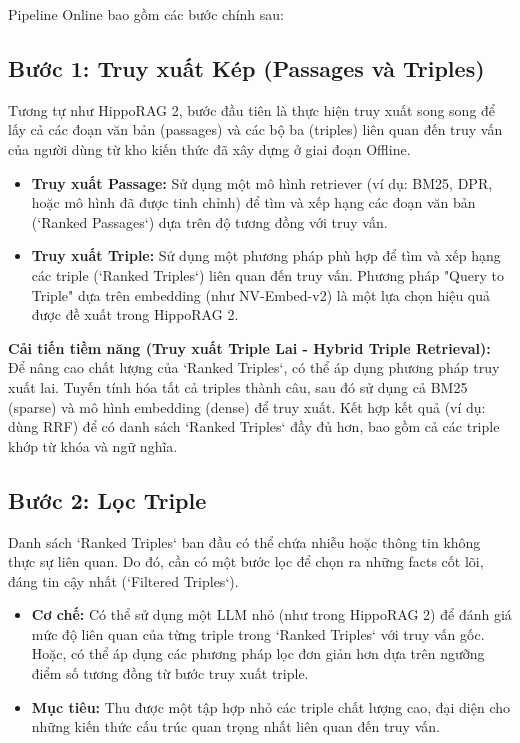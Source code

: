 \documentclass[../main.tex]{subfiles}
\begin{document}
Pipeline Online bao gồm các bước chính sau:

\subsection{Bước 1: Truy xuất Kép (Passages và Triples)}
Tương tự như HippoRAG 2, bước đầu tiên là thực hiện truy xuất song song để lấy cả các đoạn văn bản (passages) và các bộ ba (triples) liên quan đến truy vấn của người dùng từ kho kiến thức đã xây dựng ở giai đoạn Offline.
\begin{itemize}
    \item \textbf{Truy xuất Passage:} Sử dụng một mô hình retriever (ví dụ: BM25, DPR, hoặc mô hình đã được tinh chỉnh) để tìm và xếp hạng các đoạn văn bản (`Ranked Passages`) dựa trên độ tương đồng với truy vấn.
    \item \textbf{Truy xuất Triple:} Sử dụng một phương pháp phù hợp để tìm và xếp hạng các triple (`Ranked Triples`) liên quan đến truy vấn. Phương pháp "Query to Triple" dựa trên embedding (như NV-Embed-v2) là một lựa chọn hiệu quả được đề xuất trong HippoRAG 2.
\end{itemize}
\textbf{Cải tiến tiềm năng (Truy xuất Triple Lai - Hybrid Triple Retrieval):} Để nâng cao chất lượng của `Ranked Triples`, có thể áp dụng phương pháp truy xuất lai. Tuyến tính hóa tất cả triples thành câu, sau đó sử dụng cả BM25 (sparse) và mô hình embedding (dense) để truy xuất. Kết hợp kết quả (ví dụ: dùng RRF) để có danh sách `Ranked Triples` đầy đủ hơn, bao gồm cả các triple khớp từ khóa và ngữ nghĩa.

\subsection{Bước 2: Lọc Triple}
Danh sách `Ranked Triples` ban đầu có thể chứa nhiễu hoặc thông tin không thực sự liên quan. Do đó, cần có một bước lọc để chọn ra những facts cốt lõi, đáng tin cậy nhất (`Filtered Triples`).
\begin{itemize}
    \item \textbf{Cơ chế:} Có thể sử dụng một LLM nhỏ (như trong HippoRAG 2) để đánh giá mức độ liên quan của từng triple trong `Ranked Triples` với truy vấn gốc. Hoặc, có thể áp dụng các phương pháp lọc đơn giản hơn dựa trên ngưỡng điểm số tương đồng từ bước truy xuất triple.
    \item \textbf{Mục tiêu:} Thu được một tập hợp nhỏ các triple chất lượng cao, đại diện cho những kiến thức cấu trúc quan trọng nhất liên quan đến truy vấn.
\end{itemize}
\end{document}
